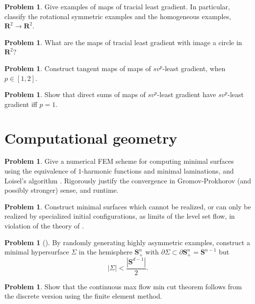 \documentclass[reqno,11pt]{amsart}
\newcommand{\RR}{\mathbf{R}}
\newcommand{\Sph}{\mathbf S}
\theoremstyle{definition}
\newtheorem{problem}[theorem]{Problem}
\numberwithin{equation}{section}
\begin{document}
\begin{problem}
Give examples of maps of tracial least gradient.
In particular, classify the rotational symmetric examples and the homogeneous examples, $\RR^2 \to \RR^2$.
\end{problem}

\begin{problem}
What are the maps of tracial least gradient with image a circle in $\RR^2$?
\end{problem}

\begin{problem}
Construct tangent maps of maps of $sv^p$-least gradient, when $p \in [1, 2]$.
\end{problem}

\begin{problem}
Show that direct sums of maps of $sv^p$-least gradient have $sv^p$-least gradient iff $p = 1$.
\end{problem}

\section{Computational geometry}
\begin{problem}
Give a numerical FEM scheme for computing minimal surfaces using the equivalence of $1$-harmonic functions and minimal laminations, and Loisel's algorithm \cite{Loisel20}.
Rigorously justify the convergence in Gromov-Prokhorov (and possibly stronger) sense, and runtime.
\end{problem}

\begin{problem}
Construct minimal surfaces which cannot be realized, or can only be realized by specialized initial configurations, as limits of the level set flow, in violation of the theory of \cite{CHOPP199377}.
\end{problem}

\begin{problem}[{\cite[Conjecture 5.3]{naff2022prescribed}}]
By randomly generating highly asymmetric examples, construct a minimal hypersurface $\Sigma$ in the hemisphere $\Sph^n_+$ with $\partial \Sigma \subset \partial \Sph^n_+ = \Sph^{n - 1}$ but
$$|\Sigma| < \frac{|\Sph^{d - 1}|}{2}.$$
\end{problem}

\begin{problem}
Show that the continuous max flow min cut theorem follows from the discrete version using the finite element method.
\end{problem}
\end{document}
